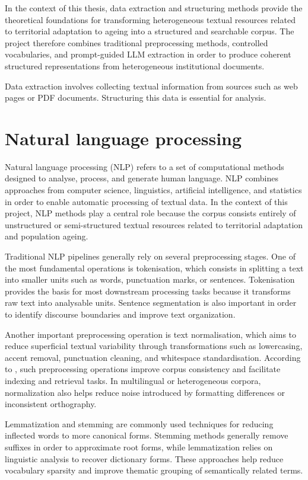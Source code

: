 \documentclass[
11pt,
english,
singlespacing,
headsepline,
]{MastersDoctoralThesis}
\begin{document}
In the context of this thesis, data extraction and structuring methods provide the theoretical foundations for transforming heterogeneous textual resources related to territorial adaptation to ageing into a structured and searchable corpus. The project therefore combines traditional preprocessing methods, controlled vocabularies, and prompt-guided LLM extraction in order to produce coherent structured representations from heterogeneous institutional documents.


Data extraction involves collecting textual information from sources such as web pages or PDF documents. Structuring this data is essential for analysis.

\section{Natural language processing}

Natural language processing (NLP) refers to a set of computational methods designed to analyse, process, and generate human language. NLP combines approaches from computer science, linguistics, artificial intelligence, and statistics in order to enable automatic processing of textual data. In the context of this project, NLP methods play a central role because the corpus consists entirely of unstructured or semi-structured textual resources related to territorial adaptation and population ageing.

Traditional NLP pipelines generally rely on several preprocessing stages. One of the most fundamental operations is tokenisation, which consists in splitting a text into smaller units such as words, punctuation marks, or sentences. Tokenisation provides the basis for most downstream processing tasks because it transforms raw text into analysable units. Sentence segmentation is also important in order to identify discourse boundaries and improve text organization.

Another important preprocessing operation is text normalisation, which aims to reduce superficial textual variability through transformations such as lowercasing, accent removal, punctuation cleaning, and whitespace standardisation. According to \citet{manning1999foundations}, such preprocessing operations improve corpus consistency and facilitate indexing and retrieval tasks. In multilingual or heterogeneous corpora, normalization also helps reduce noise introduced by formatting differences or inconsistent orthography.

Lemmatization and stemming are commonly used techniques for reducing inflected words to more canonical forms. Stemming methods generally remove suffixes in order to approximate root forms, while lemmatization relies on linguistic analysis to recover dictionary forms. These approaches help reduce vocabulary sparsity and improve thematic grouping of semantically related terms.
\end{document}
